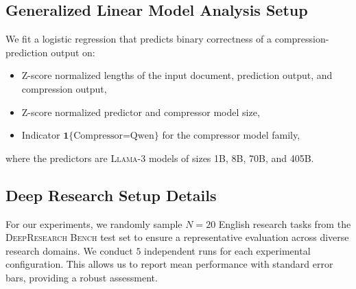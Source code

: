 \documentclass{article} %
\begin{document}
\subsection{Generalized Linear Model Analysis Setup}
\label{sec:appendix-glm-analysis}

We fit a logistic regression that predicts binary correctness of a compression-prediction output on: 
\begin{itemize}[leftmargin=*]
    \item Z-score normalized lengths of the input document, prediction output, and compression output,
    \item Z-score normalized predictor and compressor model size,
    \item Indicator \(\mathbf{1}\{\text{Compressor=Qwen}\}\) for the compressor model family,
\end{itemize}
where the predictors are \textsc{Llama-3} models of sizes 1B, 8B, 70B, and 405B.



\subsection{Deep Research Setup Details}
\label{sec:appendix-deepresearch-setup}
For our experiments, we randomly sample $N=20$ English research tasks from the \textsc{DeepResearch Bench} test set to ensure a representative evaluation across diverse research domains. We conduct $5$ independent runs for each experimental configuration. This allows us to report mean performance with standard error bars, providing a robust assessment.
  
\end{document}

